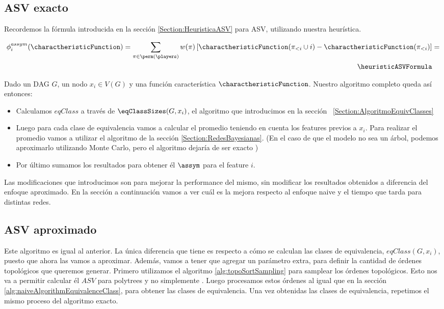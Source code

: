 
\subsection{ASV exacto}

Recordemos la fórmula introducida en la sección \ref{Section:HeuristicaASV} para ASV, utilizando nuestra heurística.

\begin{align*}
   \phi_{i}^{assym}(\charactheristicFunction) = \sum_{\pi \in \perm(\players)} w(\pi) \left[ \charactheristicFunction(\pi_{<i} \cup {i}) - \charactheristicFunction(\pi_{<i}) \right] &= \\
   \heuristicASVFormula
\end{align*}

Dado un DAG $G$, un nodo $x_i \in V(G)$ y una función característica $\charactheristicFunction$. Nuestro algoritmo completo queda así entonces: 

\begin{itemize}
    \item Calculamos $eqClass$ a través de $\eqClassSizes(G,x_i)$, el algoritmo que introducimos en la sección~ \ref{Section:AlgoritmoEquivClasses}
    \item Luego para cada clase de equivalencia vamos a calcular el promedio teniendo en cuenta los features previos a $x_i$. Para realizar el promedio vamos a utilizar el algoritmo de la sección \ref{Section:RedesBayesianas}. (En el caso de que el modelo no sea un árbol, podemos aproximarlo utilizando Monte Carlo, pero el algoritmo dejaría de ser exacto )
    \item Por último sumamos los resultados para obtener él $\assym$ para el feature $i$. 
\end{itemize}

Las modificaciones que introducimos son para mejorar la performance del mismo, sin modificar los resultados obtenidos a diferencia del enfoque aproximado. En la sección a continuación vamos a ver cuál es la mejora respecto al enfoque naive y el tiempo que tarda para distintas redes.  

\subsection{ASV aproximado}

Este algoritmo es igual al anterior. La única diferencia que tiene es respecto a cómo se calculan las clases de equivalencia, $eqClass(G, x_i)$, puesto que ahora las vamos a aproximar. Además, vamos a tener que agregar un parámetro extra, para definir la cantidad de órdenes topológicos que queremos generar. 
Primero utilizamos el algoritmo \ref{alg:topoSortSampling} para samplear los órdenes topológicos. Esto nos va a permitir calcular él $ASV$ para polytrees y no simplemente \dtrees. Luego procesamos estos órdenes al igual que en la sección \ref{alg:naiveAlgorithmEquivalenceClass}, para obtener las clases de equivalencia. Una vez obtenidas las clases de equivalencia, repetimos el mismo proceso del algoritmo exacto. 
